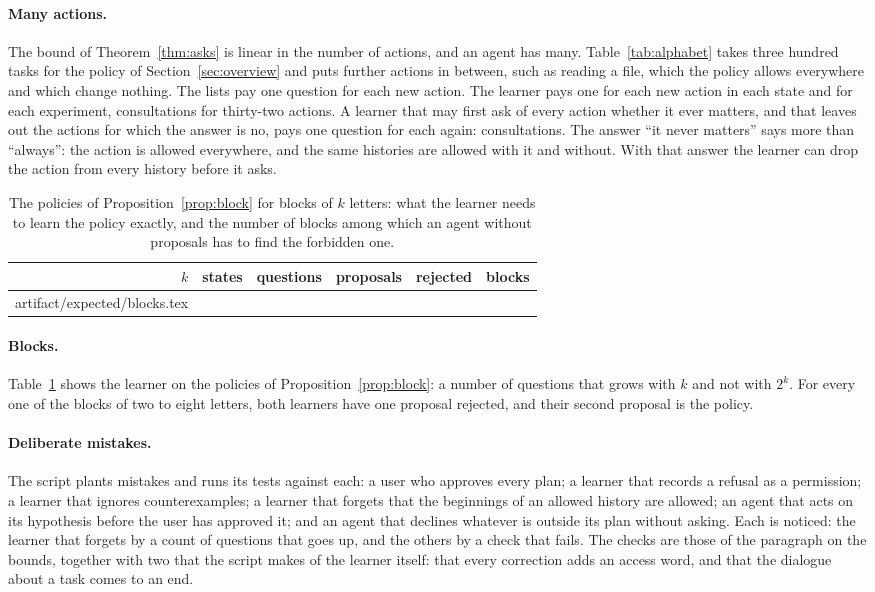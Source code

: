 \documentclass[acmsmall,nonacm,screen]{acmart}
\makeatletter
\newcommand{\claim}[2]{#2}
\newcommand{\rows}[1]{\@@input artifact/expected/#1.tex }
\makeatother
\begin{document}
\paragraph{Many actions.} The bound of Theorem~\ref{thm:asks} is linear in the number of
actions, and an agent has many. Table~\ref{tab:alphabet} takes three hundred tasks for the
policy of Section~\ref{sec:overview} and puts further actions in between, such as reading a
file, which the policy allows everywhere and which change nothing. \claim{alphabet}{The lists pay one question for
each new action. The learner pays one for each new action in each state and for each
experiment, \exAlphabetLearner{} consultations for thirty-two actions. A learner that may
first ask of every action whether it ever matters, and that leaves out the actions for which
the answer is no, pays one question for each again: \exAlphabetSifted{} consultations.} The
answer ``it never matters'' says more than ``always'': the action is allowed everywhere, and
the same histories are allowed with it and without. With that answer the learner can drop
the action from every history before it asks.

\begin{table}
\caption{The policies of Proposition~\ref{prop:block} for blocks of $k$ letters: what the
learner needs to learn the policy exactly, and the number of blocks among which an agent
without proposals has to find the forbidden one.}
\label{tab:blocks}
\small
\begin{tabular}{rrrrrr}
\toprule
$k$ & states & questions & proposals & rejected & blocks \\
\midrule
\rows{blocks}
\bottomrule
\end{tabular}
\end{table}

\paragraph{Blocks.} \claim{blocks}{Table~\ref{tab:blocks} shows the learner on the policies of
Proposition~\ref{prop:block}: a number of questions that grows with $k$ and not with $2^k$.
For every one of the \exBlocksAll{} blocks of two to eight letters, both learners have one
proposal rejected, and their second proposal is the policy.}

\paragraph{Deliberate mistakes.} The script plants \exMutants{} mistakes and runs its tests
against each: a user who approves every plan; a learner that records a refusal as a
permission; a learner that ignores counterexamples; a learner that forgets that the
beginnings of an allowed history are allowed; an agent that acts on its hypothesis before
the user has approved it; and an agent that declines whatever is outside its plan without
asking. \claim{all-noticed}{Each is noticed: the learner that forgets by a count of questions
that goes up, and the others by a check that fails.} The checks are those of the paragraph
on the bounds, together with two that the script makes of the learner itself: that every
correction adds an access word, and that the dialogue about a task comes to an end.
\end{document}
